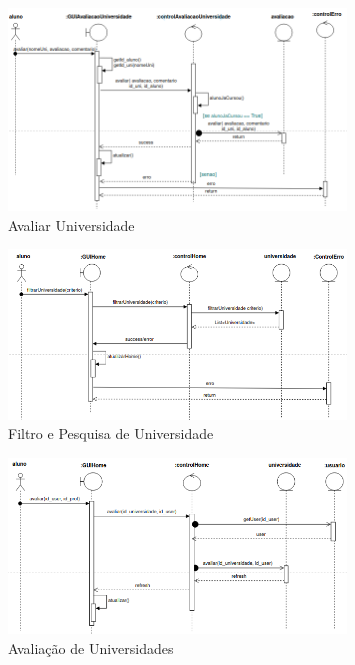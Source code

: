 \documentclass[12pt]{article}
\begin{document}
\begin{figure}[H]
  \centering
  \includegraphics[width=0.8\textwidth]{diagramas/i11-avaliar-univ.png}
  \caption{Avaliar Universidade}
  \label{fig:i11-avaliar-univ}
\end{figure}

\begin{figure}[H]
  \centering
  \includegraphics[width=0.8\textwidth]{diagramas/i12-filtro-pesq-univ.png}
  \caption{Filtro e Pesquisa de Universidade}
  \label{fig:i12-filtro-pesq-univ}
\end{figure}

\begin{figure}[H]
  \centering
  \includegraphics[width=0.8\textwidth]{diagramas/i13-avaliac-univ.png}
  \caption{Avaliação de Universidades}
  \label{fig:i13-avaliac-univ}
\end{figure}
\end{document}
